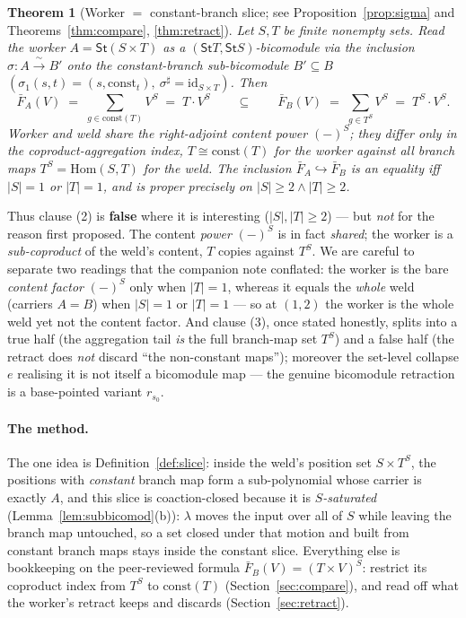 \documentclass[11pt]{article}
\newcommand{\St}{\mathsf{St}}                      %
\newcommand{\Hom}{\mathrm{Hom}}
\newcommand{\bk}[1]{{#1}^{\sharp}}                 %
\newcommand{\const}{\mathrm{const}}
\theoremstyle{plain}
\newtheorem{theorem}{Theorem}
\theoremstyle{definition}
\theoremstyle{remark}
\begin{document}
\begin{mainbox}
\begin{theorem}[Worker $=$ constant-branch slice; see
Proposition~\ref{prop:sigma} and Theorems~\ref{thm:compare}, \ref{thm:retract}]\label{thm:main}
Let $S,T$ be finite nonempty sets. Read the worker $A=\St(S\times T)$ as a
$(\St T,\St S)$-bicomodule via the inclusion $\sigma\colon A\xrightarrow{\ \sim\ }B'$
onto the constant-branch sub-bicomodule $B'\subseteq B$
$(\sigma_1(s,t)=(s,\const_t),\ \bk\sigma=\mathrm{id}_{S\times T})$. Then
\[
  \bar F_A(V)\;=\;\textstyle\sum_{g\in \const(T)} V^S \;=\; T\cdot V^S
  \qquad\subseteq\qquad
  \bar F_B(V)\;=\;\textstyle\sum_{g\in T^S} V^S \;=\; T^S\cdot V^S .
\]
Worker and weld \emph{share} the right-adjoint content power $(-)^S$; they differ
\emph{only} in the coproduct-aggregation index, $T\cong\const(T)$ for the worker against
all branch maps $T^S=\Hom(S,T)$ for the weld. The inclusion $\bar F_A\hookrightarrow\bar
F_B$ is an equality iff $|S|=1$ or $|T|=1$, and is proper precisely on $|S|\ge2\wedge
|T|\ge2$.
\end{theorem}
\end{mainbox}

Thus clause (2) is \textbf{false} where it is interesting ($|S|,|T|\ge2$) --- but
\emph{not} for the reason first proposed. The content \emph{power} $(-)^S$ is in fact
\emph{shared}; the worker is a \emph{sub-coproduct} of the weld's content, $T$ copies against
$T^S$. We are careful to separate two readings that the companion note conflated: the worker
is the bare \emph{content factor} $(-)^S$ only when $|T|=1$, whereas it equals the
\emph{whole} weld (carriers $A=B$) when $|S|=1$ or $|T|=1$ --- so at $(1,2)$ the worker is the
whole weld yet not the content factor. And clause (3), once stated honestly, splits into a
true half (the aggregation tail \emph{is} the full branch-map set $T^S$) and a false half
(the retract does \emph{not} discard ``the non-constant maps''); moreover the set-level
collapse $e$ realising it is not itself a bicomodule map --- the genuine bicomodule retraction
is a base-pointed variant $r_{s_0}$.

\paragraph{The method.}
The one idea is Definition~\ref{def:slice}: inside the weld's position set $S\times T^S$,
the positions with \emph{constant} branch map form a sub-polynomial whose carrier is
exactly $A$, and this slice is coaction-closed because it is \emph{$S$-saturated}
(Lemma~\ref{lem:subbicomod}(b)): $\lambda$ moves the input over all of $S$ while leaving the
branch map untouched, so a set closed under that motion and built from constant branch maps
stays inside the constant slice. Everything else is bookkeeping on the peer-reviewed formula
$\bar F_B(V)=(T\times V)^S$: restrict its coproduct index from $T^S$ to $\const(T)$
(Section~\ref{sec:compare}), and read off what the worker's retract keeps and discards
(Section~\ref{sec:retract}).
\end{document}
